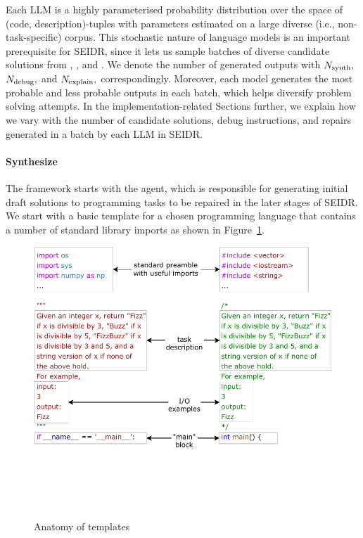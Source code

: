 Each LLM is a highly parameterised probability distribution over the space of (code, description)-tuples with parameters estimated on a large diverse (i.e., non-task-specific) corpus.
This stochastic nature of language models is an important prerequisite for SEIDR, since it lets us sample batches of diverse candidate solutions from \synthmodel{}, \debugmodel{}, and \textmodel{}. 
We denote the number of generated outputs with $N_\text{synth}{},$ $N_\text{debug}{},$ and $N_\text{explain}{},$ correspondingly.
Moreover, each model generates the most probable and less probable outputs in each batch, which helps diversify problem solving attempts. 
In the implementation-related Sections further, we explain how we vary with the number of candidate solutions, debug instructions, and repairs generated in a batch by each LLM in SEIDR.


\paragraph{Synthesize}
\label{sec:seidr-synth}


The framework starts with the \synthesize{} agent, which is responsible for generating initial draft solutions to programming tasks to be repaired in the later stages of SEIDR.
We start with a basic template for a chosen programming language that contains a number of standard library imports as shown in Figure~\ref{fig:template}.

\begin{figure}[H]
    \centering
    \includegraphics[width=0.8\linewidth, trim={0mm 40mm 0mm 0mm}, clip]{images/Templates-new-v2.pdf}
    \caption{Anatomy of \synthesize{} templates}
    \label{fig:template}
\end{figure}

